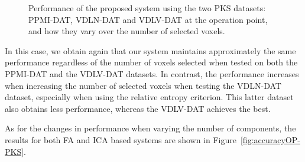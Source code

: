 \begin{figure}
	
	\caption[Performance at the operation point for the \acs{PKS} datasets, over the number of selected voxels.]{Performance of the proposed system using the two \ac{PKS} datasets: PPMI-DAT, VDLN-DAT and VDLV-DAT at the operation point, and how they vary over the number of selected voxels. } 
	\label{fig:accuracyOP-PKSvsN}
\end{figure}

In this case, we obtain again that our system maintains approximately the same performance regardless of the number of voxels selected when tested on both the PPMI-DAT and the VDLV-DAT datasets. In contrast, the performance increases when increasing the number of selected voxels when testing the VDLN-DAT dataset, especially when using the relative entropy criterion. This latter dataset also obtains less performance, whereas the VDLV-DAT achieves the best. 

As for the changes in performance when varying the number of components, the results for both \ac{FA} and \ac{ICA} based systems are shown in Figure~\ref{fig:accuracyOP-PKS}. 

